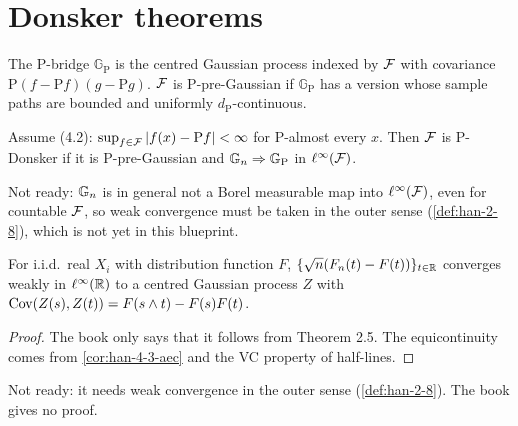 \section{Donsker theorems}

\begin{definition}
  \label{def:han-4-5}
  The $\mathrm P$-bridge $\mathbb G_{\mathrm P}$ is the centred Gaussian process indexed by $\mathcal{F}$ with covariance $\mathrm P(f-\mathrm Pf)(g-\mathrm Pg)$. $\mathcal{F}$ is $\mathrm P$-pre-Gaussian if $\mathbb G_{\mathrm P}$ has a version whose sample paths are bounded and uniformly $d_{\mathrm P}$-continuous.
\end{definition}

\begin{definition}
  \label{def:han-4-6}
  \notready
  Assume (4.2): $\sup_{f\in\mathcal{F}}|f(x)-\mathrm Pf|<\infty$ for $\mathrm P$-almost every $x$. Then $\mathcal{F}$ is $\mathrm P$-Donsker if it is $\mathrm P$-pre-Gaussian and $\mathbb{G}_n\Rightarrow\mathbb G_{\mathrm P}$ in $\ell^\infty(\mathcal{F})$.
\end{definition}
\begin{remark}
  Not ready: $\mathbb{G}_n$ is in general not a Borel measurable map into $\ell^\infty(\mathcal{F})$, even for countable $\mathcal{F}$, so weak convergence must be taken in the outer sense (\cref{def:han-2-8}), which is not yet in this blueprint.
\end{remark}

\begin{theorem}
  \label{thm:han-4-3}
  \notready
  For i.i.d.\ real $X_i$ with distribution function $F$, $\{\sqrt n(F_n(t)-F(t))\}_{t\in\mathbb{R}}$ converges weakly in $\ell^\infty(\mathbb{R})$ to a centred Gaussian process $Z$ with $\operatorname{Cov}(Z(s),Z(t))=F(s\wedge t)-F(s)F(t)$.
\end{theorem}
\begin{proof}
  The book only says that it follows from Theorem 2.5. The equicontinuity comes from \cref{cor:han-4-3-aec} and the VC property of half-lines.
\end{proof}
\begin{remark}
  Not ready: it needs weak convergence in the outer sense (\cref{def:han-2-8}). The book gives no proof.
\end{remark}

